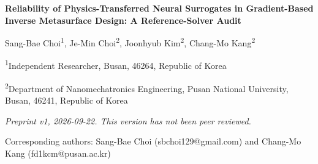 \documentclass[11pt,a4paper]{article}
\begin{document}
\begin{center}

{\LARGE\bfseries Reliability of Physics-Transferred Neural Surrogates in Gradient-Based Inverse Metasurface Design: A Reference-Solver Audit\par}

\vspace{1.2em}

{\large {Sang-Bae Choi\textsuperscript{1}, Je-Min Choi\textsuperscript{2}, Joonhyub Kim\textsuperscript{2}, Chang-Mo Kang\textsuperscript{2}}\par}

\vspace{0.8em}

{\small\itshape

\textsuperscript{1}Independent Researcher, Busan, 46264, Republic of Korea\par

\textsuperscript{2}Department of Nanomechatronics Engineering, Pusan National University, Busan, 46241, Republic of Korea\par

}

\vspace{0.6em}

{\small\itshape Preprint v1, 2026-09-22. This version has not been peer reviewed.\par}
{\small Corresponding authors: Sang-Bae Choi (sbchoi129@gmail.com) and Chang-Mo Kang (fd1kcm@pusan.ac.kr)\par}

\end{center}
\end{document}
